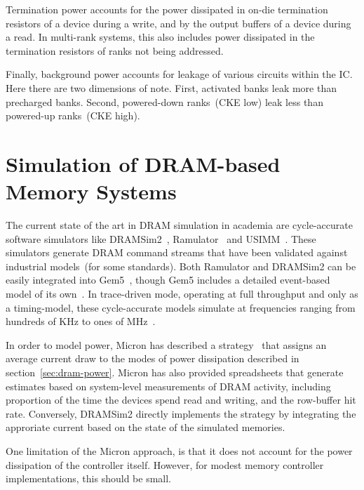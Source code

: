 Termination power accounts for the power dissipated in on-die termination
resistors of a device during a write, and by the output buffers of a device
during a read. In multi-rank systems, this also includes power dissipated in
the termination resistors of ranks not being addressed.

Finally, background power accounts for leakage of various circuits within the
IC. Here there are two dimensions of note. First, activated banks
leak more than precharged banks. Second, powered-down ranks~(CKE low) leak less
than powered-up ranks~(CKE high).


\section{Simulation of DRAM-based Memory Systems}

The current state of the art in DRAM simulation in academia are cycle-accurate
software simulators like DRAMSim2~\cite{dramsim}, Ramulator~\cite{ramulator} and
USIMM~\cite{usimm}. These simulators generate DRAM command streams that have been
validated against industrial models~(for some standards). Both Ramulator and
DRAMSim2 can be easily integrated into Gem5~\cite{gem5}, though Gem5 includes a
detailed event-based model of its own~\cite{gem5event}. In trace-driven mode,
operating at full throughput and only as a timing-model, these cycle-accurate
models simulate at frequencies ranging from hundreds of KHz to ones of
MHz~\cite{ramulator}.

In order to model power, Micron has described a strategy~\cite{micronpower}
that assigns an average current draw to the modes of power dissipation
described in section~\ref{sec:dram-power}. Micron has also provided
spreadsheets that generate estimates based on system-level measurements of DRAM
activity, including proportion of the time the devices spend read and writing,
and the row-buffer hit rate.  Conversely, DRAMSim2 directly implements the
strategy by integrating the approriate current based on the state of the
simulated memories.

One limitation of the Micron approach, is that it does not account for the
power dissipation of the controller itself. However, for modest memory
controller implementations, this should be small.
